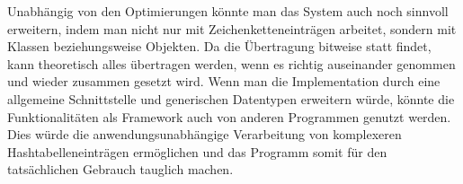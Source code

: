 \documentclass{scrreprt}
\begin{document}
Unabhängig von den Optimierungen könnte man das System auch noch sinnvoll erweitern, indem man nicht nur mit Zeichenketteneinträgen arbeitet, sondern mit Klassen beziehungsweise Objekten. Da die Übertragung bitweise statt findet, kann theoretisch alles übertragen werden, wenn es richtig auseinander genommen und wieder zusammen gesetzt wird. Wenn man die Implementation durch eine allgemeine Schnittstelle und generischen Datentypen erweitern würde, könnte die Funktionalitäten als Framework auch von anderen Programmen genutzt werden. Dies würde die anwendungsunabhängige Verarbeitung von komplexeren Hashtabelleneinträgen ermöglichen und das Programm somit für den tatsächlichen Gebrauch tauglich machen.

\nocite{*}
\printbibliography

\listoffigures
 
\listoftables
\end{document}
